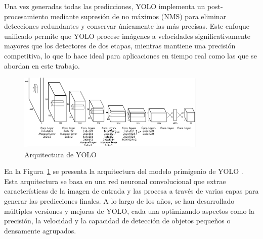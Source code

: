 \documentclass[11pt,spanish,listoffigures,listoftables]{tfgetsinf}
\begin{document}
Una vez generadas todas las predicciones, YOLO implementa un post-procesamiento mediante supresión de no máximos (NMS) para eliminar detecciones redundantes y conservar únicamente las más precisas. Este enfoque unificado permite que YOLO procese imágenes a velocidades significativamente mayores que los detectores de dos etapas, mientras mantiene una precisión competitiva, lo que lo hace ideal para aplicaciones en tiempo real como las que se abordan en este trabajo.

\begin{figure}[H]
   \centering
   \includegraphics[width=0.8\textwidth]{images/estado_del_arte/yolo_architecture.png}
   \caption{Arquitectura de YOLO}
   \label{fig:yolo_architecture}
\end{figure}

En la Figura~\ref{fig:yolo_architecture} se presenta la arquitectura del modelo primigenio de YOLO \cite{redmon2016lookonceunifiedrealtime}. Esta arquitectura se basa en una red neuronal convolucional que extrae características de la imagen de entrada y las procesa a través de varias capas para generar las predicciones finales. A lo largo de los años, se han desarrollado múltiples versiones y mejoras de YOLO, cada una optimizando aspectos como la precisión, la velocidad y la capacidad de detección de objetos pequeños o densamente agrupados.
\end{document}
